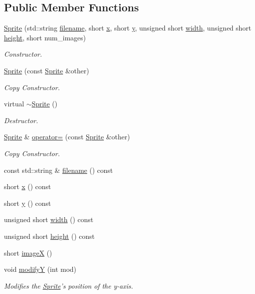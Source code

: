 \subsection*{Public Member Functions}
\begin{DoxyCompactItemize}
\item 
\hyperlink{classSprite_a848f031c098042b68984b3840ce64604}{Sprite} (std\-::string \hyperlink{classSprite_aae3514a9a1f77ab5e8e213e44ec618a3}{filename}, short \hyperlink{classSprite_a18eb1c5b90418641d3eabda8f7fe56c9}{x}, short \hyperlink{classSprite_afca2c03aad9d2526427470688ae76439}{y}, unsigned short \hyperlink{classSprite_ac56c9242f797a1a2f76687fca636a3c4}{width}, unsigned short \hyperlink{classSprite_ae96d42c46af7aad1f9031da62f878b21}{height}, short num\-\_\-images)
\begin{DoxyCompactList}\small\item\em Constructor. \end{DoxyCompactList}\item 
\hyperlink{classSprite_ac17f0e18a22c84234a659b1c0bbb69de}{Sprite} (const \hyperlink{classSprite}{Sprite} \&other)
\begin{DoxyCompactList}\small\item\em Copy Constructor. \end{DoxyCompactList}\item 
virtual \hyperlink{classSprite_a8accab430f9d90ae5117b57d67e32b84}{$\sim$\-Sprite} ()
\begin{DoxyCompactList}\small\item\em Destructor. \end{DoxyCompactList}\item 
\hyperlink{classSprite}{Sprite} \& \hyperlink{classSprite_abb3f0673884d42b6b116f0c4d1a47b77}{operator=} (const \hyperlink{classSprite}{Sprite} \&other)
\begin{DoxyCompactList}\small\item\em Copy Constructor. \end{DoxyCompactList}\item 
const std\-::string \& \hyperlink{classSprite_aae3514a9a1f77ab5e8e213e44ec618a3}{filename} () const 
\item 
short \hyperlink{classSprite_a18eb1c5b90418641d3eabda8f7fe56c9}{x} () const 
\item 
short \hyperlink{classSprite_afca2c03aad9d2526427470688ae76439}{y} () const 
\item 
unsigned short \hyperlink{classSprite_ac56c9242f797a1a2f76687fca636a3c4}{width} () const 
\item 
unsigned short \hyperlink{classSprite_ae96d42c46af7aad1f9031da62f878b21}{height} () const 
\item 
short \hyperlink{classSprite_a2703a7a7b2acc1dec83dd1c4f5054aef}{image\-X} ()
\item 
void \hyperlink{classSprite_a587e5f7d415b1210ffeb091c69818914}{modify\-Y} (int mod)
\begin{DoxyCompactList}\small\item\em Modifies the \hyperlink{classSprite}{Sprite}'s position of the y-\/axis. \end{DoxyCompactList}\end{DoxyCompactItemize}
